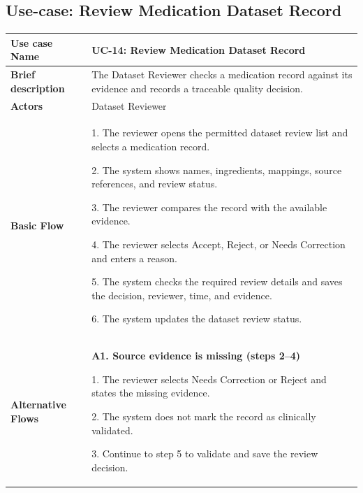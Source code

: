
\subsection{Use-case: Review Medication Dataset Record}
\label{uc:uc-14}
\begin{longtable}{|p{}|p{}|}
\hline
\textbf{Use case Name} & UC-14: Review Medication Dataset Record \\ \hline
\textbf{Brief description} & The Dataset Reviewer checks a medication record against its evidence and records a traceable quality decision. \\ \hline
\textbf{Actors} & Dataset Reviewer \\ \hline
\textbf{Basic Flow} &
1. The reviewer opens the permitted dataset review list and selects a medication record.\par
2. The system shows names, ingredients, mappings, source references, and review status.\par
3. The reviewer compares the record with the available evidence.\par
4. The reviewer selects Accept, Reject, or Needs Correction and enters a reason.\par
5. The system checks the required review details and saves the decision, reviewer, time, and evidence.\par
6. The system updates the dataset review status.
\\ \hline
\textbf{Alternative Flows} &

\textbf{A1. Source evidence is missing (steps 2--4)}\par
1. The reviewer selects Needs Correction or Reject
and states the missing evidence.\par
2. The system does not mark the record as
clinically validated.\par
3. Continue to step 5 to validate and save
the review decision.


\end{longtable}
